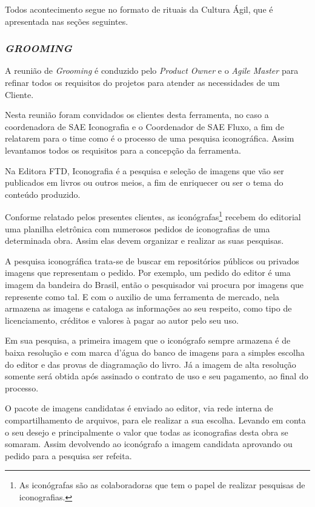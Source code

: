 \documentclass[
  12pt,				%
  openany,
  oneside,
  a4paper,			%
  english,			%
  brazil
]{article}
\numberwithin{figure}{section}
\numberwithin{table}{section}
\newcounter{subsubsubsection}[subsubsection]
\begin{document}
Todos acontecimento segue no formato de rituais da Cultura Ágil, que é apresentada nas seções seguintes.


\subsubsection{\textit{GROOMING}}

A reunião de \textit{Grooming} é conduzido pelo \textit{Product Owner} e o \textit{Agile Master} para refinar todos os requisitos do projetos para atender as necessidades de um Cliente.

Nesta reunião foram convidados os clientes desta ferramenta, no caso a coordenadora de SAE Iconografia e o Coordenador de SAE Fluxo, a fim de relatarem para o time como é o processo de uma pesquisa iconográfica. Assim levantamos todos os requisitos para a concepção da ferramenta.

Na Editora FTD, Iconografia é a pesquisa e seleção de imagens que vão ser publicados em livros ou outros meios, a fim de enriquecer ou ser o tema do conteúdo produzido.



Conforme relatado pelos presentes clientes, as iconógrafas\footnote{As iconógrafas são as colaboradoras que tem o papel de realizar pesquisas de iconografias.} recebem do editorial uma planilha eletrônica com numerosos pedidos de iconografias de uma determinada obra. Assim elas devem organizar e realizar as suas pesquisas.

A pesquisa iconográfica trata-se de buscar em repositórios públicos ou privados imagens que representam o pedido. Por exemplo, um pedido do editor é uma imagem da bandeira do Brasil, então o pesquisador vai procura por imagens que represente como tal. E com o auxilio de uma ferramenta de mercado, nela armazena as imagens e cataloga as informações ao seu respeito, como tipo de licenciamento, créditos e valores à pagar ao autor pelo seu uso.

Em sua pesquisa, a primeira imagem que o iconógrafo sempre armazena é de baixa resolução e com marca d'água do banco de imagens para a simples escolha do editor e das provas de diagramação do livro. Já a imagem de alta resolução somente será obtida após assinado o contrato de uso e seu pagamento, ao final do processo.

O pacote de imagens candidatas é enviado ao editor, via rede interna de compartilhamento de arquivos, para ele realizar a sua escolha. Levando em conta o seu desejo e principalmente o valor que todas as iconografias desta obra se somaram. Assim devolvendo ao iconógrafo a imagem candidata aprovando ou pedido para a pesquisa ser refeita.
\end{document}
